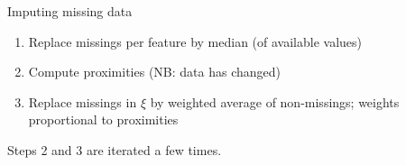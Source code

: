 \documentclass[11pt,compress,t,notes=noshow, xcolor=table]{beamer}
\begin{document}
\begin{frame}{Imputing missing data}

\begin{enumerate}
\item Replace missings per feature by median (of available values)
\item Compute proximities (NB: data has changed)
\item Replace missings in $\xi$ by weighted average of non-missings; weights proportional to proximities
\end{enumerate}

\lz

Steps 2 and 3 are iterated a few times. %
\end{frame}

\endlecture
\end{document}
